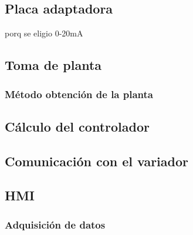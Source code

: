\subsection{Placa adaptadora}
porq se eligio 0-20mA

\subsection{Toma de planta}
    \subsubsection{Método obtención de la planta}
\subsection{Cálculo del controlador}
\subsection{Comunicación con el variador}
\subsection{HMI}
    \subsubsection{Adquisición de datos}